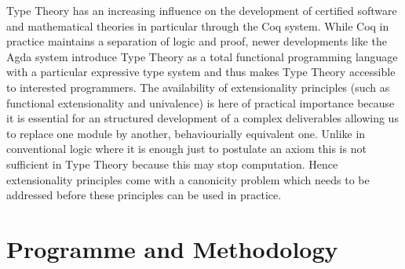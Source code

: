 \documentclass[twocolumn,a4paper,11pt]{article}
\begin{document}
{Type Theory has an increasing influence on the development of
certified software and mathematical theories in particular through the
Coq system. While Coq in practice maintains a separation of logic and
proof, newer developments like the Agda system introduce Type Theory
as a total functional programming language with a particular
expressive type system and thus makes Type Theory accessible to
interested programmers. The availability of extensionality principles
(such as functional extensionality and univalence)
is here of practical importance because it is essential for an
structured development of a complex deliverables allowing us to 
replace one module by another, behaviourially equivalent one.
Unlike in conventional logic where it is enough just to postulate an
axiom this is not sufficient in Type Theory because this may stop
computation. Hence extensionality principles come with a canonicity
problem which needs to be addressed before these principles can be used
in practice. 







\section{Programme and Methodology}

}
\end{document}

